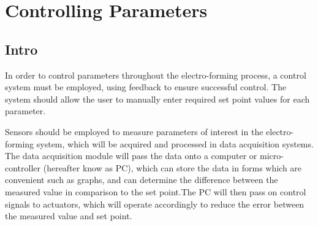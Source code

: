 \section{Controlling Parameters}
\subsection{Intro}
In order to control parameters throughout the electro-forming process, a control system must be employed, using feedback to ensure successful control. The system should allow the user to manually enter required set point values for each parameter.

Sensors should be employed to measure parameters of interest in the electro-forming system, which will be acquired and processed in data acquisition systems. The data acquisition module will pass the data onto a computer or micro-controller (hereafter know as PC), which can store the data in forms which are convenient such as graphs, and can determine the difference between the measured value in comparison to the set point.The PC will then pass on control signals to actuators, which will operate accordingly to reduce the error between the measured value and set point. 